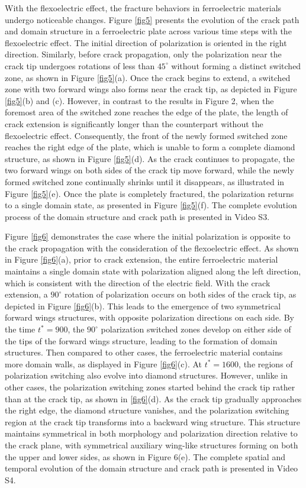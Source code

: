 With the flexoelectric effect, the fracture behaviors in ferroelectric materials undergo noticeable changes. Figure \ref{fig5} presents the evolution of the crack path and domain structure in a ferroelectric plate across various time steps with the flexoelectric effect. The initial direction of polarization is oriented in the right direction. Similarly, before crack propagation, only the polarization near the crack tip undergoes rotations of less than $45^\circ$ without forming a distinct switched zone, as shown in Figure \ref{fig5}(a). Once the crack begins to extend, a switched zone with two forward wings also forms near the crack tip, as depicted in Figure \ref{fig5}(b) and (c). However, in contrast to the results in Figure 2, when the foremost area of the switched zone reaches the edge of the plate, the length of crack extension is significantly longer than the counterpart without the flexoelectric effect. Consequently, the front of the newly formed switched zone reaches the right edge of the plate, which is unable to form a complete diamond structure, as shown in Figure \ref{fig5}(d). As the crack continues to propagate, the two forward wings on both sides of the crack tip move forward, while the newly formed switched zone continually shrinks until it disappears, as illustrated in Figure \ref{fig5}(e). Once the plate is completely fractured, the polarization returns to a single domain state, as presented in Figure \ref{fig5}(f). The complete evolution process of the domain structure and crack path is presented in Video S3.

Figure \ref{fig6} demonstrates the case where the initial polarization is opposite to the crack propagation with the consideration of the flexoelectric effect. As shown in Figure \ref{fig6}(a), prior to crack extension, the entire ferroelectric material maintains a single domain state with polarization aligned along the left direction, which is consistent with the direction of the electric field. With the crack extension, a $90^\circ$ rotation of polarization occurs on both sides of the crack tip, as depicted in Figure \ref{fig6}(b). This leads to the emergence of two symmetrical forward wings structures, with opposite polarization directions on each side. By the time $t^*=900$, the $90^\circ$ polarization switched zones develop on either side of the tips of the forward wings structure, leading to the formation of domain structures. Then compared to other cases, the ferroelectric material contains more domain walls, as displayed in Figure \ref{fig6}(c). At $t^*=1600$, the regions of polarization switching also evolve into diamond structures. However, unlike in other cases, the polarization switching zones started behind the crack tip rather than at the crack tip, as shown in \ref{fig6}(d). As the crack tip gradually approaches the right edge, the diamond structure vanishes, and the polarization switching region at the crack tip transforms into a backward wing structure. This structure maintains symmetrical in both morphology and polarization direction relative to the crack plane, with symmetrical auxiliary wing-like structures forming on both the upper and lower sides, as shown in Figure 6(e). The complete spatial and temporal evolution of the domain structure and crack path is presented in Video S4.

